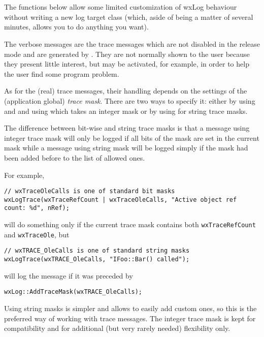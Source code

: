 \\
\\

\label{wxlogcustomization}

The functions below allow some limited customization of wxLog behaviour
without writing a new log target class (which, aside of being a matter of
several minutes, allows you to do anything you want).

The verbose messages are the trace messages which are not disabled in the
release mode and are generated by . They
are not normally shown to the user because they present little interest, but
may be activated, for example, in order to help the user find some program
problem.

As for the (real) trace messages, their handling depends on the settings of
the (application global) {\it trace mask}. There are two ways to specify it:
either by using  and 
 and using 
 which takes an integer mask or by using 
 for string trace masks.

The difference between bit-wise and string trace masks is that a message using
integer trace mask will only be logged if all bits of the mask are set in the
current mask while a message using string mask will be logged simply if the
mask had been added before to the list of allowed ones.

For example,
\begin{verbatim}
// wxTraceOleCalls is one of standard bit masks
wxLogTrace(wxTraceRefCount | wxTraceOleCalls, "Active object ref count: %d", nRef);
\end{verbatim}
will do something only if the current trace mask contains both 
{\tt wxTraceRefCount} and {\tt wxTraceOle}, but
\begin{verbatim}
// wxTRACE_OleCalls is one of standard string masks
wxLogTrace(wxTRACE_OleCalls, "IFoo::Bar() called");
\end{verbatim}
will log the message if it was preceded by
\begin{verbatim}
wxLog::AddTraceMask(wxTRACE_OleCalls);
\end{verbatim}

Using string masks is simpler and allows to easily add custom ones, so this is
the preferred way of working with trace messages. The integer trace mask is
kept for compatibility and for additional (but very rarely needed) flexibility
only.

